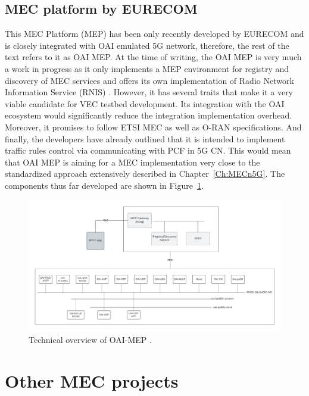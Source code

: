 \documentclass[12pt,a4paper,twoside]{report}
\begin{document}
\subsection{MEC platform by EURECOM}
This MEC Platform (MEP) has been only recently developed by EURECOM and is closely integrated with OAI emulated 5G network, therefore, the rest of the text refers to it as OAI MEP. At the time of writing, the OAI MEP is very much a work in progress as it only implements a MEP environment for registry and discovery of MEC services and offers its own implementation of Radio Network Information Service (RNIS) \cite{oai-mep-git}. However, it has several traits that make it a very viable candidate for VEC testbed development. Its integration with the OAI ecosystem would significantly reduce the integration implementation overhead. Moreover, it promises to follow ETSI MEC as well as O-RAN specifications. And finally, the developers have already outlined that it is intended to implement traffic rules control via communicating with PCF in 5G CN. This would mean that OAI MEP is aiming for a MEC implementation very close to the standardized approach extensively described in Chapter~\ref{Ch:MECn5G}. The components thus far developed are shown in Figure~\ref{F:oai-mep}.
\begin{figure}[ht]
	\centering
	\includegraphics[width=\textwidth]{./images/OAI-MEP.pdf}
	\caption{Technical overview of OAI-MEP \cite{oai-mep-git}.}
	\label{F:oai-mep}
\end{figure}
\FloatBarrier

\section{Other MEC projects}
\end{document}
